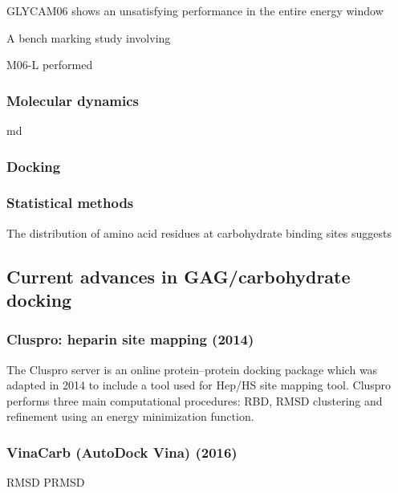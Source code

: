 \documentclass[journal=jctcce,manuscript=article]{achemso}
\begin{document}
{GLYCAM06 shows an unsatisfying performance in the entire energy window

A bench marking study involving 

M06-L performed 

\subsubsection{Molecular dynamics}
\Ac{md}

\subsubsection{Docking}

\subsubsection{Statistical methods}

The distribution of amino acid residues at carbohydrate binding sites suggests

\subsection{Current advances in GAG/carbohydrate docking}

\subsubsection{Cluspro: heparin site mapping (2014)}

The Cluspro server is an online protein--protein docking package which was adapted in 2014 to include a tool used for \ac{Hep}/\ac{HS} site mapping tool.\cite{Comeau2007ClusPro:Server, Mottarella2014DockingProteins,Kozakov2017TheDocking.} 
Cluspro performs three main computational procedures: \ac{RBD}, \ac{RMSD} clustering and refinement using an energy minimization function.\cite{Kozakov2017TheDocking.} 


\subsubsection{VinaCarb (AutoDock Vina) (2016)}
\ac{RMSD}
\ac{PRMSD}

}
\end{document}
